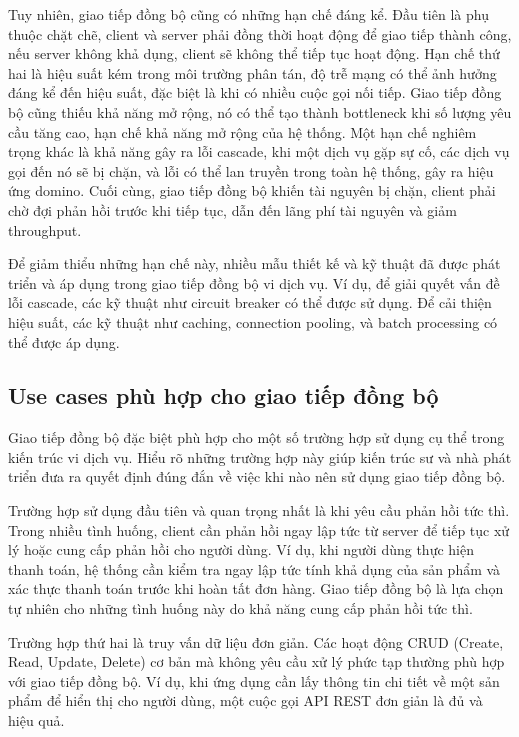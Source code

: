 Tuy nhiên, giao tiếp đồng bộ cũng có những hạn chế đáng kể. Đầu tiên là phụ thuộc chặt chẽ, client và server phải đồng thời hoạt động để giao tiếp thành công, nếu server không khả dụng, client sẽ không thể tiếp tục hoạt động. Hạn chế thứ hai là hiệu suất kém trong môi trường phân tán, độ trễ mạng có thể ảnh hưởng đáng kể đến hiệu suất, đặc biệt là khi có nhiều cuộc gọi nối tiếp. Giao tiếp đồng bộ cũng thiếu khả năng mở rộng, nó có thể tạo thành bottleneck khi số lượng yêu cầu tăng cao, hạn chế khả năng mở rộng của hệ thống. Một hạn chế nghiêm trọng khác là khả năng gây ra lỗi cascade, khi một dịch vụ gặp sự cố, các dịch vụ gọi đến nó sẽ bị chặn, và lỗi có thể lan truyền trong toàn hệ thống, gây ra hiệu ứng domino. Cuối cùng, giao tiếp đồng bộ khiến tài nguyên bị chặn, client phải chờ đợi phản hồi trước khi tiếp tục, dẫn đến lãng phí tài nguyên và giảm throughput.

Để giảm thiểu những hạn chế này, nhiều mẫu thiết kế và kỹ thuật đã được phát triển và áp dụng trong giao tiếp đồng bộ vi dịch vụ. Ví dụ, để giải quyết vấn đề lỗi cascade, các kỹ thuật như circuit breaker có thể được sử dụng. Để cải thiện hiệu suất, các kỹ thuật như caching, connection pooling, và batch processing có thể được áp dụng.

\subsection{Use cases phù hợp cho giao tiếp đồng bộ }
Giao tiếp đồng bộ đặc biệt phù hợp cho một số trường hợp sử dụng cụ thể trong kiến trúc vi dịch vụ. Hiểu rõ những trường hợp này giúp kiến trúc sư và nhà phát triển đưa ra quyết định đúng đắn về việc khi nào nên sử dụng giao tiếp đồng bộ.

Trường hợp sử dụng đầu tiên và quan trọng nhất là khi yêu cầu phản hồi tức thì. Trong nhiều tình huống, client cần phản hồi ngay lập tức từ server để tiếp tục xử lý hoặc cung cấp phản hồi cho người dùng. Ví dụ, khi người dùng thực hiện thanh toán, hệ thống cần kiểm tra ngay lập tức tính khả dụng của sản phẩm và xác thực thanh toán trước khi hoàn tất đơn hàng. Giao tiếp đồng bộ là lựa chọn tự nhiên cho những tình huống này do khả năng cung cấp phản hồi tức thì.

Trường hợp thứ hai là truy vấn dữ liệu đơn giản. Các hoạt động CRUD (Create, Read, Update, Delete) cơ bản mà không yêu cầu xử lý phức tạp thường phù hợp với giao tiếp đồng bộ. Ví dụ, khi ứng dụng cần lấy thông tin chi tiết về một sản phẩm để hiển thị cho người dùng, một cuộc gọi API REST đơn giản là đủ và hiệu quả.

